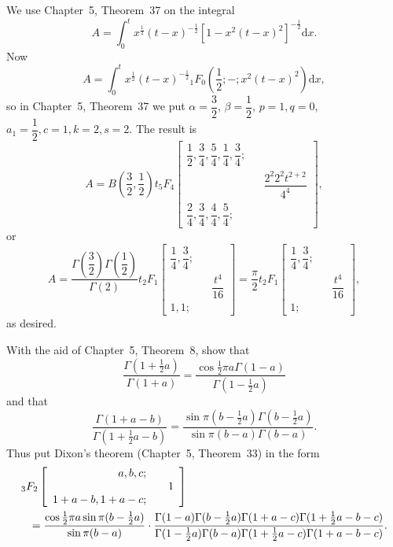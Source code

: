 \begin{solution}
We use Chapter~5, Theorem~37 on the integral
$$A = \displaystyle\int_0^t x^{\frac{1}{2}} (t-x)^{-\frac{1}{2}} [1 - x^2(t-x)^2]^{-\frac{1}{2}} \mathrm{d}x.$$
Now
$$A = \displaystyle\int_0^t x^{\frac{1}{2}} (t-x)^{-\frac{1}{2}} {}_1F_0 \left( \dfrac{1}{2}; - ; x^2(t-x)^2 \right) \mathrm{d}x,$$
so in Chapter~5, Theorem~37 we put $\alpha = \dfrac{3}{2}$, $\beta = \dfrac{1}{2}$, $p=1,
q=0$, $a_1 = \dfrac{1}{2}, c=1, k=2, s=2.$ The result is
$$A = B \left( \dfrac{3}{2}, \dfrac{1}{2} \right)t {}_5F_4 \left[ \begin{array}{rlr}
\dfrac{1}{2}, \dfrac{3}{4}, \dfrac{5}{4}, \dfrac{1}{4}, \dfrac{3}{4}; & & \\
& & \dfrac{2^2 2^2 t^{2+2}}{4^4} \\
\dfrac{2}{4}, \dfrac{3}{4}, \dfrac{4}{4}, \dfrac{5}{4}; 
\end{array} \right],$$
or
$$A = \dfrac{\Gamma \left( \dfrac{3}{2} \right) \Gamma \left( \dfrac{1}{2} \right)}{\Gamma(2)}t {}_2F_1 \left[ \begin{array}{rlr}
\dfrac{1}{4}, \dfrac{3}{4}; & & \\
& & \dfrac{t^4}{16} \\
1, 1; & &
\end{array} \right] = \dfrac{\pi}{2} t {}_2F_1 \left[ \begin{array}{rlr}
\dfrac{1}{4}, \dfrac{3}{4}; & & \\
& & \dfrac{t^4}{16} \\
1; & &
\end{array} \right],$$
as desired.
\end{solution}
\begin{problem}\label{problem3chapter5}
With the aid of Chapter~5, Theorem~8, show that
$$\dfrac{\Gamma(1+\frac{1}{2}a)}{\Gamma(1+a)} = \dfrac{\cos \frac{1}{2}\pi a \Gamma(1-a)}{\Gamma(1 - \frac{1}{2}a)}$$
and that
$$\dfrac{\Gamma(1+a-b)}{\Gamma(1 + \frac{1}{2}a - b)} = \dfrac{\sin \pi(b-\frac{1}{2}a) \Gamma(b- \frac{1}{2}a)}{\sin \pi (b-a) \Gamma(b-a)}.$$
Thus put Dixon's theorem (Chapter~5, Theorem~33) in the form
\begin{eqnarray*}
\lefteqn{{}_3F_2 \left[ \begin{array}{rlr}
a,b,c; & & \\
& & 1 \\
1+a-b,1+a-c; & &
\end{array} \right]}\\
& & = \dfrac{\cos \frac{1}{2}\pi a \sin \pi(b-\frac{1}{2}a)}{\sin \pi(b-a)} \cdot \dfrac{\Gamma(1-a)\Gamma(b-\frac{1}{2}a) \Gamma(1+a-c) \Gamma(1 + \frac{1}{2}a - b - c)}{\Gamma(1 - \frac{1}{2}a) \Gamma(b-a) \Gamma(1 + \frac{1}{2}a-c) \Gamma(1+a-b-c)}.
\end{eqnarray*}
\end{problem}
